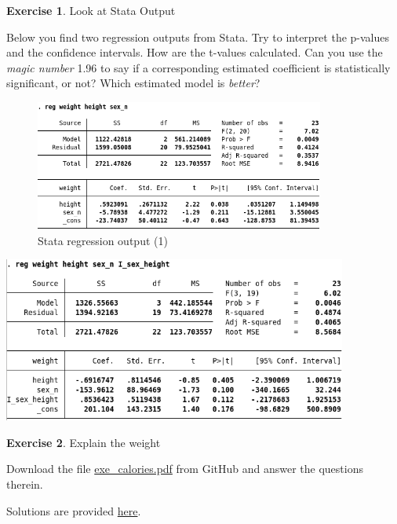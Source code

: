 \documentclass[
  12pt,
  oneside]{book}
\theoremstyle{definition}
\theoremstyle{definition}
\theoremstyle{definition}
\newtheorem{exercise}{Exercise}[chapter]
\theoremstyle{definition}
\theoremstyle{remark}
\begin{document}
\begin{exercise}
\protect\hypertarget{exr:exrstataoutput}{}\label{exr:exrstataoutput}Look at Stata Output

Below you find two regression outputs from Stata. Try to interpret the p-values and the confidence intervals. How are the t-values calculated. Can you use the \emph{magic number} 1.96 to say if a corresponding estimated coefficient is statistically significant, or not? Which estimated model is \emph{better}?

\begin{figure}
\centering
\includegraphics[width=0.85\textwidth,height=\textheight]{fig/reg_stata_class2.png}
\caption{\label{fig:regstata3} Stata regression output (1)}
\end{figure}

\includegraphics[width=0.85\textwidth,height=\textheight]{fig/reg_stata_class.png}
\end{exercise}

\begin{exercise}
\protect\hypertarget{exr:explainweight}{}\label{exr:explainweight}Explain the weight

Download the file \href{https://github.com/hubchev/courses/blob/main/pdfs/exe_calories.pdf}{exe\_calories.pdf} from GitHub and answer the questions therein.

Solutions are provided \href{https://raw.githubusercontent.com/hubchev/courses/main/scr/regress_lecture.R}{here}.
\end{exercise}
\end{document}
